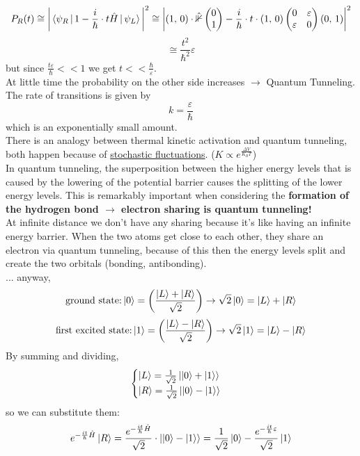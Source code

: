 \[
P_R(t)\cong\bigg|\braket{\psi_R\,|\,1-\frac{i}{\hbar}\cdot t \hat{H}\,|\,\psi_L}\bigg|^2 \cong
\bigg|(1,\,0) \cdot \mathbb{\hat{1}}
\begin{pmatrix}
0\\1
\end{pmatrix}
-\frac{i}{\hbar}\cdot t \cdot (1,\,0)
\begin{pmatrix}
0 & \varepsilon\\ \varepsilon & 0
\end{pmatrix}
(0,\,1)\bigg|^2
\]
\[
\cong \frac{t^2}{\hbar^2}\varepsilon
\]
but since $\frac{t\varepsilon}{\hbar}<<1$ we get $t << \frac{\hbar}{\varepsilon}$.\\
At little time the probability on the other side increases $\rightarrow$ Quantum Tunneling. \\
The rate of transitions is given by
\[
k=\frac{\varepsilon}{\hbar}
\]
which is an exponentially small amount.\\
There is an analogy between thermal kinetic activation and quantum tunneling, both happen because of \underline{stochastic fluctuations}. ($K\propto e^{\frac{\Delta V}{K_B T}}$)\\
In quantum tunneling, the superposition between the higher energy levels that is caused by the lowering of the potential barrier causes the splitting of the lower energy levels. This is remarkably important when considering the \textbf{formation of the hydrogen bond $\rightarrow$ electron sharing is quantum tunneling!}\\
At infinite distance we don't have any sharing because it's like having an infinite energy barrier. When the two atoms get close to each other, they share an electron via quantum tunneling, because of this then the energy levels split and create the two orbitals (bonding, antibonding).\\
... anyway,
\[
\text{ground state:} \ket{0}=\bigg(\frac{\ket{L}+\ket{R}}{\sqrt{2}}\bigg) \rightarrow \sqrt{2}\ket{0}= \ket{L}+\ket{R}
\]
\[
\text{first excited state:} \ket{1}=\bigg(\frac{\ket{L}-\ket{R}}{\sqrt{2}}\bigg) \rightarrow \sqrt{2}\ket{1}= \ket{L}-\ket{R}
\]
By summing and dividing,
\[
\begin{cases}
\ket{L}=\frac{1}{\sqrt{2}}\ket{\ket{0}+\ket{1}}\\
\ket{R}=\frac{1}{\sqrt{2}}\ket{\ket{0}-\ket{1}}
\end{cases}
\]
so we can substitute them:
\[
e^{-\frac{it}{\hbar}\hat{H}}\ket{R}=\frac{e^{-\frac{it}{\hbar}\hat{H}}}{\sqrt{2}}\cdot \ket{\ket{0}-\ket{1}}=\frac{1}{\sqrt{2}}\ket{0}-\frac{e^{-\frac{it}{\hbar}\varepsilon}}{\sqrt{2}}\ket{1}
\]
